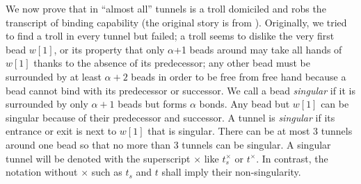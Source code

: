 We now prove that in ``almost all'' tunnels is a troll domiciled and robs the transcript of binding capability (the original story is from \cite{Pratchett1992}). 
Originally, we tried to find a troll in every tunnel but failed; a troll seems to dislike the very first bead $w[1]$, or its property that only $\alpha$+1 beads around may take all hands of $w[1]$ thanks to the absence of its predecessor; any other bead must be surrounded by at least $\alpha+2$ beads in order to be free from free hand because a bead cannot bind with its predecessor or successor. 
We call a bead \textit{singular} if it is surrounded by only $\alpha+1$ beads but forms $\alpha$ bonds. 
Any bead but $w[1]$ can be singular because of their predecessor and successor. 
A tunnel is \textit{singular} if its entrance or exit is next to $w[1]$ that is singular. 
There can be at most 3 tunnels around one bead so that no more than 3 tunnels can be singular. 
A singular tunnel will be denoted with the superscript $\times$ like $t_s^\times$ or $t^\times$. 
In contrast, the notation without $\times$ such as $t_s$ and $t$ shall imply their non-singularity. 

